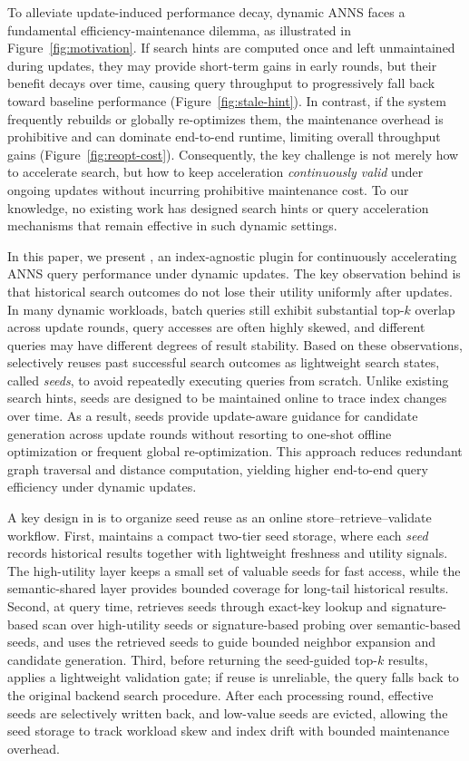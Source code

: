 To alleviate update-induced performance decay, dynamic ANNS faces a fundamental efficiency-maintenance dilemma, as illustrated in Figure~\ref{fig:motivation}. If search hints are computed once and left 
unmaintained during updates, they may provide short-term gains in early rounds, but their benefit decays over time, causing query throughput to progressively fall back toward baseline performance (Figure~\ref{fig:stale-hint}). In contrast, if the system frequently 
rebuilds or globally re-optimizes them, the maintenance overhead is prohibitive and can dominate end-to-end runtime, limiting overall throughput gains (Figure~\ref{fig:reopt-cost}). Consequently, the key challenge is not merely how 
to accelerate search, but how to keep acceleration \emph{continuously valid} under ongoing updates without incurring prohibitive maintenance cost. To our knowledge, no existing work has designed search hints or query acceleration mechanisms that remain effective in such dynamic settings.


In this paper, we present \system, an index-agnostic plugin for continuously accelerating ANNS query performance under dynamic updates. The key observation behind \system is that historical search outcomes do not lose their utility uniformly after updates. In many dynamic workloads, batch queries still exhibit substantial top-$k$ overlap across update rounds, query accesses are often highly skewed, and different queries may have different degrees of result stability. Based on these observations, \system selectively reuses past successful search outcomes as lightweight search states, called \textit{seeds}, to avoid repeatedly executing queries from scratch. Unlike existing search hints, seeds are designed to be maintained online to trace index changes over time. As a result, seeds provide update-aware guidance for candidate generation across update rounds without resorting to one-shot offline optimization or frequent global re-optimization.
This approach reduces redundant graph traversal and distance computation, yielding higher end-to-end query efficiency under dynamic updates.

A key design in \system is to organize seed reuse as an online store--retrieve--validate workflow.
First, \system maintains a compact two-tier seed storage, where each \textit{seed} records historical results together with lightweight freshness and utility signals.
The high-utility layer keeps a small set of valuable seeds for fast access, while the semantic-shared layer provides bounded coverage for long-tail historical results.
Second, at query time, \system retrieves seeds through exact-key lookup and signature-based scan over high-utility seeds or signature-based probing over semantic-based seeds, and uses the retrieved seeds to guide bounded neighbor expansion and candidate generation. Third, before returning the seed-guided top-$k$ results, \system applies a lightweight validation gate; if reuse is unreliable, the query falls back to the original backend search procedure.
After each processing round, effective seeds are selectively written back, and low-value seeds are evicted, allowing the seed storage to track workload skew and index drift with bounded maintenance overhead.


